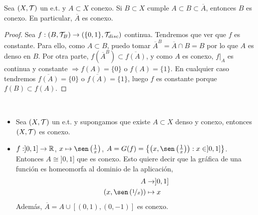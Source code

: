 \begin{prop}
    Sea $(X, \mathcal{T})$ un e.t. y $A\subset X$ conexo. Si $B\subset X$ cumple $A\subset B \subset \overline{A}$, entonces $B$ es conexo. En particular, $\overline{A}$ es conexo.
    \begin{proof}
        Sea $f:(B, \mathcal{T}_B)\to (\{0,1\}, \mathcal{T}_{disc})$ continua. Tendremos que ver que $f$ es constante. Para ello, como $A\subset B$, puedo tomar $\overline{A}^B=\overline{A}\cap B = B$ por lo que $A$ es denso en $B$. Por otra parte, $f(\overline{A}^B)\subset \overline{f(A)}$, y como $A$ es conexo, $f|_A$ es continua y constante $\Rightarrow f(A)=\{0\}$ o $f(A)=\{1\}$. En cualquier caso tendremos $\overline{f(A)}=\{0\}$ o $\overline{f(A)}=\{1\}$, luego $f$ es constante porque $f(B)\subset f(A)$.

    \end{proof}
\end{prop}

\begin{ejemplo}\
    \begin{itemize}
        \item Sea $(X, \mathcal{T})$ un e.t. y supongamos que existe $A\subset X$ denso y conexo, entonces $(X, \mathcal{T})$ es conexo.
        \item $f:]0,1] \to \mathbb{R}$, $x\mapsto \sen\left(\frac{1}{x}\right)$, $A=G(f)=\left\{\left(x, \sen\left(\frac{1}{x}\right)\right): x\in ]0,1]\right\}$. Entonces $A\cong ]0,1]$ que es conexo. Esto quiere decir que la gráfica de una función es homeomorfa al dominio de la aplicación,
        \begin{align*}
            A & \to ]0,1]\\
            \left(x, \sen\left(\nicefrac{1}{x}\right)\right) & \mapsto x
        \end{align*}
        Además, $\overline{A}=A\cup[(0,1),(0,-1)]$ es conexo.
    \end{itemize}
    \endsquare
\end{ejemplo}


